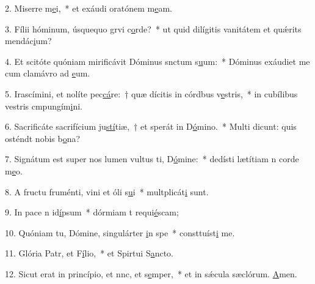 2. Miserre m\uline{e}i,~* et exáudi oratónem m\uline{e}am.\par 
3. Fílii hóminum, úsquequo grvi c\uline{o}rde?~* ut quid dilígitis vanitátem et quǽrits mendác\uline{i}um?\par 
4. Et scitóte quóniam mirificávit Dóminus snctum s\uline{u}um:~* Dóminus exáudiet me cum clamávro ad \uline{e}um.\par 
5. Irascímini, et nolíte pec\uline{cá}re:~† quæ dícitis in córdbus v\uline{e}stris,~* in cubílibus vestris cmpungím\uline{i}ni.\par 
6. Sacrificáte sacrifícium ju\uline{stí}tiæ,~† et sperát in D\uline{ó}mino.~* Multi dicunt: quis osténdt nobis b\uline{o}na?\par 
7. Signátum est super nos lumen vultus ti, D\uline{ó}mine:~* dedísti lætítiam n corde m\uline{e}o.\par 
8. A fructu fruménti, vini et óli s\uline{u}i~* multplicát\uline{i} sunt.\par 
9. In pace n id\uline{í}psum~* dórmiam t requi\uline{é}scam;\par 
10. Quóniam tu, Dómine, singulárter \uline{i}n spe~* consttuíst\uline{i} me.\par 
11. Glória Patr, et F\uline{í}lio,~* et Spirtui S\uline{a}ncto.\par 
12. Sicut erat in princípio, et nnc, et s\uline{e}mper,~* et in sǽcula sæclórum. \uline{A}men.\par 
